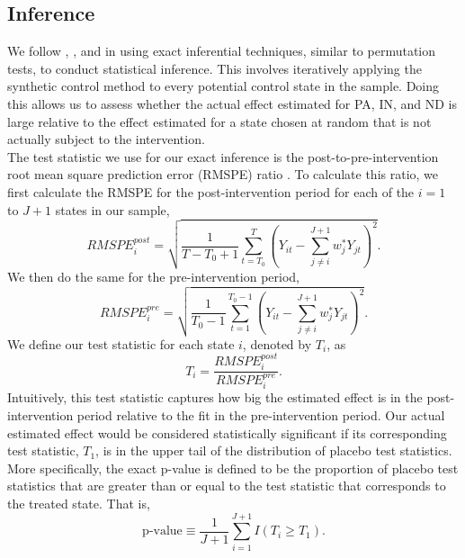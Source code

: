 \documentclass[../Main.tex]{subfiles}
\begin{document}
\subsection{Inference} \label{inference}
We follow \citet{abadie2010synthetic}, \citet{cavallo2013catastrophic}, and \cite{dube2015pooling} in using exact inferential techniques, similar to permutation tests, to conduct statistical inference. This involves iteratively applying the synthetic control method to every potential control state in the sample. Doing this allows us to assess whether the actual effect estimated for PA, IN, and ND is large relative to the effect estimated for a state chosen at random that is not actually subject to the intervention.\\
\indent The test statistic we use for our exact inference is the post-to-pre-intervention root mean square prediction error (RMSPE) ratio \citep{abadie2010synthetic}. To calculate this ratio, we first calculate the RMSPE for the post-intervention period for each of the $i = 1$ to $J+1$ states in our sample,
\begin{equation}
    RMSPE_i^{post} = \sqrt{\frac{1}{T-T_0+1}\sum_{t=T_0}^T\left(Y_{it}-\sum_{j\neq i}^{J+1}w_j^* Y_{jt}\right)^2}.
\end{equation}
We then do the same for the pre-intervention period,
\begin{equation}
    RMSPE_i^{pre} = \sqrt{\frac{1}{T_0 - 1}\sum_{t=1}^{T_0 - 1}\left(Y_{it}-\sum_{j\neq i}^{J+1}w_j^* Y_{jt}\right)^2}.
\end{equation}
We define our test statistic for each state $i$, denoted by $T_i$, as
\begin{equation}
    T_i = \frac{RMSPE_i^{post}}{RMSPE_i^{pre}}.
\end{equation}
Intuitively, this test statistic captures how big the estimated effect is in the post-intervention period relative to the fit in the pre-intervention period. Our actual estimated effect would be considered statistically significant if its corresponding test statistic, $T_1$, is in the upper tail of the distribution of placebo test statistics. More specifically, the exact p-value is defined to be the proportion of placebo test statistics that are greater than or equal to the test statistic that corresponds to the treated state. That is,
\begin{equation}
    \text{p-value} \equiv \frac{1}{J+1}\sum_{i=1}^{J+1}I\left(T_i \geq T_1 \right).
\end{equation}
\end{document}
